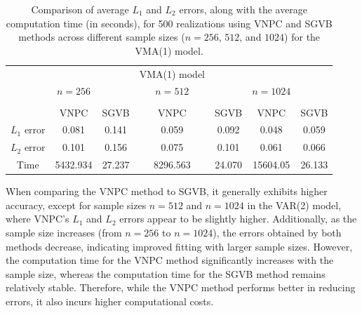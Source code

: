 \documentclass[12pt,a4paper]{article}
\begin{document}
\begin{table}[h]
\centering
\begin{tabular}{ccccccc}
\hline
\quad & \quad & \quad & {VMA(1) model} & \quad & \quad & \quad\\
\quad & $n=256$ & \quad & $n = 512$ & \quad & $n = 1024$\\
\hline\\
\quad & {VNPC} & {SGVB} & {VNPC} & {SGVB} & {VNPC} & {SGVB}\\
{$L_1$ error} & 0.081 & 0.141 & 0.059 & 0.092 & 0.048 & 0.059\\
{$L_2$ error} & 0.101 & 0.156 & 0.075 & 0.101 & 0.061 & 0.066\\
{Time} & 5432.934 & 27.237 & 8296.563 & 24.070 & 15604.05 & 26.133\\
\hline
\end{tabular}
\caption{Comparison of average $L_1$ and $L_2$ errors, along with the average computation time (in seconds), for 500 realizations using VNPC and SGVB methods across different sample sizes ($n=256$, $512$, and $1024$) for the VMA(1) model.}
\label{table l1l2 vma1} 
\end{table}

When comparing the VNPC method to SGVB, it generally exhibits higher accuracy, except for sample sizes $n=512$ and $n=1024$ in the VAR(2) model, where VNPC's $L_1$ and $L_2$ errors appear to be slightly higher. Additionally, as the sample size increases (from $n=256$ to $n=1024$), the errors obtained by both methods decrease, indicating improved fitting with larger sample sizes. However, the computation time for the VNPC method significantly increases with the sample size, whereas the computation time for the SGVB method remains relatively stable. Therefore, while the VNPC method performs better in reducing errors, it also incurs higher computational costs.
\end{document}

